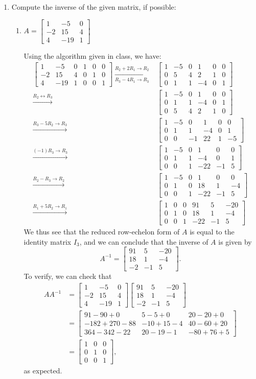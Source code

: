 \documentclass[12pt]{article}
\newcommand{\baam}{\left[\begin{array}{ccc|ccc}}
\newcommand{\eaam}{\end{array}\right]}
\newcommand{\bbm}{\begin{bmatrix}}
\newcommand{\ebm}{\end{bmatrix}}
\begin{document}
\thispagestyle{fancy}
 \begin{enumerate}
\item Compute the inverse of the given matrix, if possible:
\begin{enumerate}
 \item $A = \bbm 1&-5&0\\-2&15&4\\4&-19&1\ebm$

\bigskip

Using the algorithm given in class, we have:
\begin{align*}
 \baam 1&-5&0&1&0&0\\-2&15&4&0&1&0\\4&-19&1&0&0&1\eaam \xrightarrow[R_3-4R_1\to R_3]{R_2+2R_1\to R_2} & \baam 1&-5&0&1&0&0\\0&5&4&2&1&0\\0&1&1&-4&0&1\eaam\\
\xrightarrow{R_2\leftrightarrow R_3} & \baam 1&-5&0&1&0&0\\0&1&1&-4&0&1\\0&5&4&2&1&0\eaam\\
\xrightarrow{R_3-5R_2\to R_3} & \baam 1&-5&0&1&0&0\\0&1&1&-4&0&1\\0&0&-1&22&1&-5\eaam\\
\xrightarrow{(-1)R_3\to R_3} & \baam 1&-5&0&1&0&0\\0&1&1&-4&0&1\\0&0&1&-22&-1&5\eaam\\
\xrightarrow{R_2-R_3\to R_2} & \baam 1&-5&0&1&0&0\\0&1&0&18&1&-4\\0&0&1&-22&-1&5\eaam\\
\xrightarrow{R_1+5R_2\to R_1} & \baam 1&0&0&91&5&-20\\0&1&0&18&1&-4\\0&0&1&-22&-1&5\eaam
\end{align*}
We thus see that the reduced row-echelon form of $A$ is equal to the identity matrix $I_3$, and we can conclude that the inverse of $A$ is given by 
\[
 A^{-1} = \bbm 91&5&-20\\18&1&-4\\-2&-1&5\ebm.
\]
To verify, we can check that 
\begin{align*}
 AA^{-1} &= \bbm 1&-5&0\\-2&15&4\\4&-19&1\ebm\bbm 91&5&-20\\18&1&-4\\-2&-1&5\ebm\\
& = \bbm 91-90+0 & 5-5+0 & 20-20+0\\-182+270-88&-10+15-4&40-60+20\\364-342-22&20-19-1&-80+76+5\ebm\\& = \bbm 1&0&0\\0&1&0\\0&0&1\ebm,
\end{align*}
as expected.



\end{enumerate}
\end{enumerate}
\end{document}
